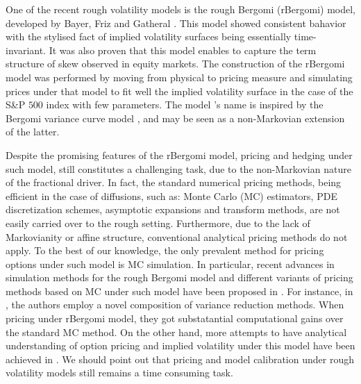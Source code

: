  
 One of the recent rough volatility models is the rough Bergomi (rBergomi) model, developed by Bayer, Friz and Gatheral \cite{bayer2016pricing}. This model showed   consistent bahavior with the stylised fact of implied volatility surfaces being essentially time-invariant. It was also proven that this model 
 enables to capture the term structure of skew observed in equity markets. The construction of the rBergomi model was performed by  moving from  physical to pricing measure and simulating prices under that model to fit well the implied volatility surface in the case of the S\&P $500$ index with few parameters. The model 's name is inspired by the Bergomi variance curve model \cite{bergomi2005smile}, and may be seen as a non-Markovian
 extension of the latter.
 
Despite the promising features of the rBergomi model, pricing  and hedging under such model, still constitutes a challenging task, due  to the non-Markovian nature of the fractional driver. In fact, the standard numerical pricing methods, being efficient in  the case of diffusions, such as: Monte Carlo (MC) estimators, PDE discretization schemes, asymptotic expansions and transform
methods, are not easily  carried over to the rough setting. Furthermore,  due to the lack of Markovianity or affine structure, conventional analytical pricing methods  do not apply. To the best of our knowledge, the only prevalent method for pricing  options under such model is MC simulation. In particular,  recent advances in simulation methods for the rough Bergomi model and different variants of pricing methods based on  MC under such model   have been proposed in \cite{bayer2016pricing,bayer2017regularity,mccrickerd2017turbocharging,bennedsen2017hybrid,jacquier2018vix}.  For instance, in \cite{mccrickerd2017turbocharging}, the authors employ a novel composition of variance reduction methods. When pricing under rBergomi model, they got  substatantial computational gains  over the standard MC method. On the other hand,  more attempts to have  analytical understanding of option pricing and implied volatility under this model have been achieved  in \cite{jacquier2017pathwise,bayer2017short,forde2017asymptotics}. We should point out that pricing and model calibration under rough volatility models still remains a time consuming task.


